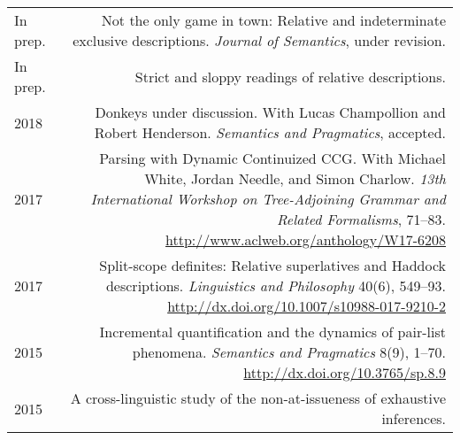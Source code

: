 \documentclass[12pt]{article}
\renewcommand{\arraystretch}{1.25} %
\newcommand{\doi}[1]{\url{http://dx.doi.org/#1}}
\newcommand{\refmark}{\textcolor{gray}{\textdagger}}
\begin{document}
\begingroup
\renewcommand{\arraystretch}{1.5} %
\begin{longtable}{LR}
  In prep.  & Not the only game in town: Relative and indeterminate exclusive
              descriptions.\newline
              \textit{Journal of Semantics}, under revision.\\
  In prep.  & Strict and sloppy readings of relative descriptions.\\
  2018  & Donkeys under discussion.\newline
              With Lucas Champollion and Robert Henderson.\newline
              \textit{Semantics and Pragmatics}, accepted.\\
  2017  & Parsing with Dynamic Continuized CCG.\newline
          With Michael White, Jordan Needle, and Simon Charlow.\newline
          \textit{13th International Workshop on Tree-Adjoining Grammar and
          Related Formalisms}, 71--83.\newline
          \url{http://www.aclweb.org/anthology/W17-6208}\\
  2017  & Split-scope definites: Relative superlatives and Haddock
          descriptions.\newline
          \textit{Linguistics and Philosophy} 40(6), 549--93.\newline
          \doi{10.1007/s10988-017-9210-2}\\
  2015  & Incremental quantification and the dynamics of pair-list phenomena.\newline
          \textit{Semantics and Pragmatics} 8(9), 1--70.\newline
          \doi{10.3765/sp.8.9}\\
  2015  & A cross-linguistic study of the non-at-issueness of exhaustive
          inferences.\newline

\end{longtable}
\end{document}
